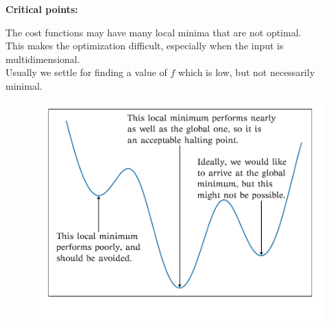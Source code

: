 \documentclass[10pt, compress]{beamer}
\begin{document}
\begin{frame}
  \textbf{Critical points:}
  \begin{multicols}{2}
    The cost functions may have many local minima that are not optimal. \\
    This makes the optimization difficult, especially when the input is multidimensional.\\
    Usually we settle for finding a value of $f$ which is low, but not necessarily minimal.

  \columnbreak

    \begin{figure}
      \includegraphics[width=1\linewidth]{imgs/minima.pdf}
    \end{figure}
  \end{multicols}
\end{frame}
\end{document}

